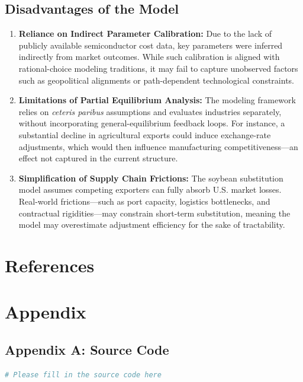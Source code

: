 \documentclass{apmcmthesis}
\begin{document}
\subsection{Disadvantages of the Model}
\begin{enumerate}
    \item \textbf{Reliance on Indirect Parameter Calibration:}
    Due to the lack of publicly available semiconductor cost data, key parameters were inferred indirectly from market outcomes. 
    While such calibration is aligned with rational-choice modeling traditions, it may fail to capture unobserved factors 
    such as geopolitical alignments or path-dependent technological constraints.

    \item \textbf{Limitations of Partial Equilibrium Analysis:}
    The modeling framework relies on \textit{ceteris paribus} assumptions and evaluates industries separately, 
    without incorporating general-equilibrium feedback loops. 
    For instance, a substantial decline in agricultural exports could induce exchange-rate adjustments, 
    which would then influence manufacturing competitiveness—an effect not captured in the current structure.

    \item \textbf{Simplification of Supply Chain Frictions:}
    The soybean substitution model assumes competing exporters can fully absorb U.S. market losses. 
    Real-world frictions—such as port capacity, logistics bottlenecks, and contractual rigidities—may constrain short-term substitution, 
    meaning the model may overestimate adjustment efficiency for the sake of tractability.
\end{enumerate}

\newpage
\section*{References}






\newpage
\section*{Appendix}
\subsection{Appendix A: Source Code}
\begin{lstlisting}[language=python,caption={Python Source Code for Question 1}]
# Please fill in the source code here
\end{lstlisting}
\end{document}
